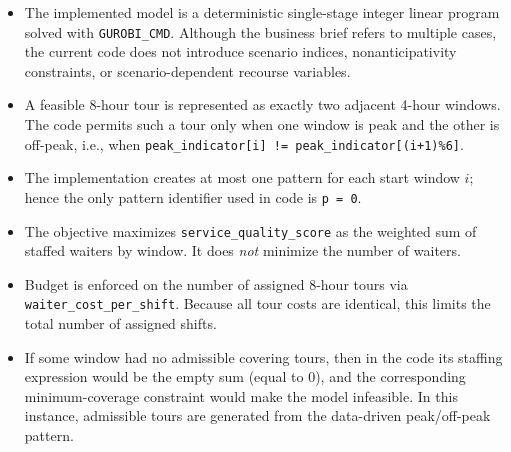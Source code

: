 \begin{itemize}
    \item The implemented model is a deterministic single-stage integer linear program solved with \texttt{GUROBI\_CMD}. Although the business brief refers to multiple cases, the current code does not introduce scenario indices, nonanticipativity constraints, or scenario-dependent recourse variables.
    \item A feasible 8-hour tour is represented as exactly two adjacent 4-hour windows. The code permits such a tour only when one window is peak and the other is off-peak, i.e., when \texttt{peak\_indicator[i] != peak\_indicator[(i+1)\%6]}.
    \item The implementation creates at most one pattern for each start window $i$; hence the only pattern identifier used in code is \texttt{p = 0}.
    \item The objective maximizes \texttt{service\_quality\_score} as the weighted sum of staffed waiters by window. It does \emph{not} minimize the number of waiters.
    \item Budget is enforced on the number of assigned 8-hour tours via \texttt{waiter\_cost\_per\_shift}. Because all tour costs are identical, this limits the total number of assigned shifts.
    \item If some window had no admissible covering tours, then in the code its staffing expression would be the empty sum (equal to $0$), and the corresponding minimum-coverage constraint would make the model infeasible. In this instance, admissible tours are generated from the data-driven peak/off-peak pattern.
\end{itemize}
